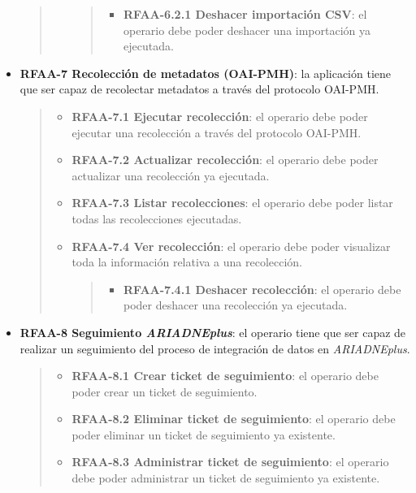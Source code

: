 \begin{itemize}
\begin{quote}
\begin{itemize}
    \begin{quote}
    \begin{itemize}
    \tightlist
    \item
      \textbf{RFAA-6.2.1 Deshacer importación CSV}: el operario debe
      poder deshacer una importación ya ejecutada.
    \end{itemize}
    \end{quote}
  \end{itemize}
  \end{quote}
\item
  \textbf{RFAA-7 Recolección de metadatos (OAI-PMH)}: la aplicación
  tiene que ser capaz de recolectar metadatos a través del protocolo
  OAI-PMH.

  \begin{quote}
  \begin{itemize}
  \item
    \textbf{RFAA-7.1 Ejecutar recolección}: el operario debe poder
    ejecutar una recolección a través del protocolo OAI-PMH.
  \item
    \textbf{RFAA-7.2 Actualizar recolección}: el operario debe poder
    actualizar una recolección ya ejecutada.
  \item
    \textbf{RFAA-7.3 Listar recolecciones}: el operario debe poder
    listar todas las recolecciones ejecutadas.
  \item
    \textbf{RFAA-7.4 Ver recolección}: el operario debe poder visualizar
    toda la información relativa a una recolección.

    \begin{quote}
    \begin{itemize}
    \tightlist
    \item
      \textbf{RFAA-7.4.1 Deshacer recolección}: el operario debe poder
      deshacer una recolección ya ejecutada.
    \end{itemize}
    \end{quote}
  \end{itemize}
  \end{quote}
\item
  \textbf{RFAA-8 Seguimiento \emph{ARIADNEplus}}: el operario tiene que ser
  capaz de realizar un seguimiento del proceso de integración de datos
  en \emph{ARIADNEplus}.

  \begin{quote}
  \begin{itemize}
  \item
    \textbf{RFAA-8.1 Crear ticket de seguimiento}: el operario debe
    poder crear un ticket de seguimiento.
  \item
    \textbf{RFAA-8.2 Eliminar ticket de seguimiento}: el operario debe
    poder eliminar un ticket de seguimiento ya existente.
  \item
    \textbf{RFAA-8.3 Administrar ticket de seguimiento}: el operario
    debe poder administrar un ticket de seguimiento ya existente.


\end{itemize}
\end{quote}
\end{itemize}
